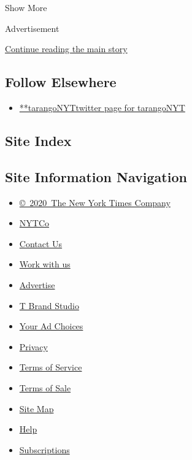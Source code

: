 Show More

Advertisement

\protect\hyperlink{after-mid2}{Continue reading the main story}

\hypertarget{follow-elsewhere}{%
\subsection{Follow Elsewhere}\label{follow-elsewhere}}

\begin{itemize}
\tightlist
\item
  \href{https://twitter.com/tarangoNYT}{**tarangoNYTtwitter page for
  tarangoNYT}
\end{itemize}

\hypertarget{site-index}{%
\subsection{Site Index}\label{site-index}}

\hypertarget{site-information-navigation}{%
\subsection{Site Information
Navigation}\label{site-information-navigation}}

\begin{itemize}
\tightlist
\item
  \href{https://help.nytimes3xbfgragh.onion/hc/en-us/articles/115014792127-Copyright-notice}{©~2020~The
  New York Times Company}
\end{itemize}

\begin{itemize}
\tightlist
\item
  \href{https://www.nytco.com/}{NYTCo}
\item
  \href{https://help.nytimes3xbfgragh.onion/hc/en-us/articles/115015385887-Contact-Us}{Contact
  Us}
\item
  \href{https://www.nytco.com/careers/}{Work with us}
\item
  \href{https://nytmediakit.com/}{Advertise}
\item
  \href{http://www.tbrandstudio.com/}{T Brand Studio}
\item
  \href{https://www.nytimes3xbfgragh.onion/privacy/cookie-policy\#how-do-i-manage-trackers}{Your
  Ad Choices}
\item
  \href{https://www.nytimes3xbfgragh.onion/privacy}{Privacy}
\item
  \href{https://help.nytimes3xbfgragh.onion/hc/en-us/articles/115014893428-Terms-of-service}{Terms
  of Service}
\item
  \href{https://help.nytimes3xbfgragh.onion/hc/en-us/articles/115014893968-Terms-of-sale}{Terms
  of Sale}
\item
  \href{https://spiderbites.nytimes3xbfgragh.onion}{Site Map}
\item
  \href{https://help.nytimes3xbfgragh.onion/hc/en-us}{Help}
\item
  \href{https://www.nytimes3xbfgragh.onion/subscription?campaignId=37WXW}{Subscriptions}
\end{itemize}
